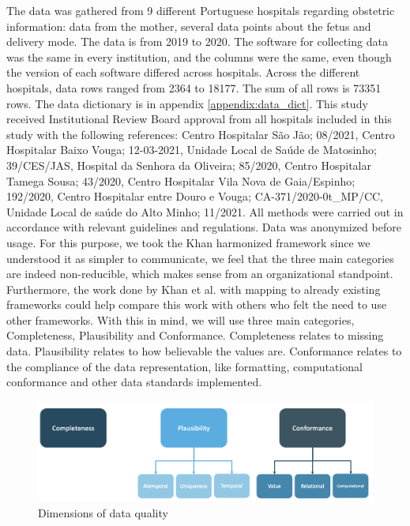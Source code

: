 The data was gathered from 9 different Portuguese hospitals regarding obstetric information: data from the mother, several data points about the fetus and delivery mode. The data is from 2019 to 2020. The software for collecting data was the same in every institution, and the columns were the same, even though the version of each software differed across hospitals. Across the different hospitals, data rows ranged from 2364 to 18177. The sum of all rows is 73351 rows. The data dictionary is in appendix \ref{appendix:data_dict}. This study received Institutional Review Board approval from all hospitals included in this study with the following references: Centro Hospitalar São Jão; 08/2021, Centro Hospitalar Baixo Vouga; 12-03-2021, Unidade Local de Saúde de Matosinho; 39/CES/JAS, Hospital da Senhora da Oliveira; 85/2020, Centro Hospitalar Tamega Sousa; 43/2020, Centro Hospitalar Vila Nova de Gaia/Espinho; 192/2020, Centro Hospitalar entre Douro e Vouga; CA-371/2020-0t\_MP/CC, Unidade Local de saúde do Alto Minho; 11/2021. All methods were carried out in accordance with relevant guidelines and regulations.
Data was anonymized before usage. 
For this purpose, we took the Khan harmonized framework since we understood it as simpler to communicate, we feel that the three main categories are indeed non-reducible, which makes sense from an organizational standpoint. Furthermore, the work done by Khan et al. with mapping to already existing frameworks could help compare this work with others who felt the need to use other frameworks. With this in mind, we will use three main categories, Completeness, Plausibility and Conformance. Completeness relates to missing data. Plausibility relates to how believable the values are. Conformance relates to the compliance of the data representation, like formatting, computational conformance and other data standards implemented. 

\begin{figure}[htbp]
\centering
\caption{Dimensions of data quality}\label{fig:categories} 
\includegraphics[scale=0.29]{figures/data-quality-v1.png}
\end{figure}
